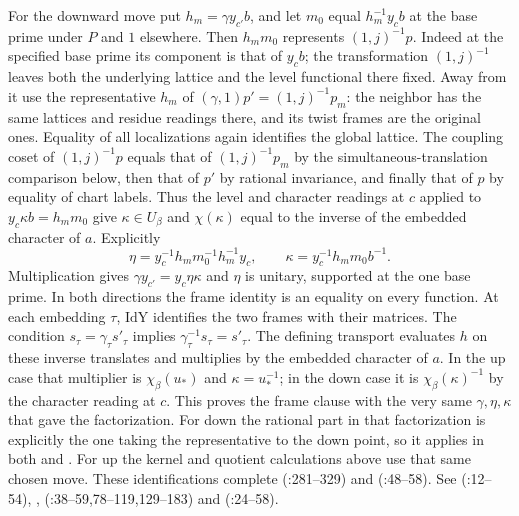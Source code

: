 For the downward move put $h_m=\gamma y_{c'}b$, and let $m_0$ equal
$h_m^{-1}y_c b$ at the base prime under $P$ and $1$ elsewhere.
Then $h_m m_0$ represents $(1,j)^{-1}p$. Indeed at the specified
base prime its component is that of $y_c b$; the transformation
$(1,j)^{-1}$ leaves both the underlying lattice and the level functional
there fixed. Away from it use the representative $h_m$ of
$(\gamma,1)p'=(1,j)^{-1}p_m$: the neighbor has the same lattices and
residue readings there, and its twist frames are the original ones.
Equality of all localizations again identifies the global lattice.
The coupling coset of $(1,j)^{-1}p$ equals that of $(1,j)^{-1}p_m$
by the simultaneous-translation comparison below, then that of $p'$
by rational invariance, and finally that of $p$ by equality of chart
labels. Thus the level and character readings at $c$ applied to
$y_c\kappa b=h_m m_0$ give $\kappa\in U_\beta$ and
$\chi(\kappa)$ equal to the inverse of the embedded character of $a$.
Explicitly
\[
 \eta=y_c^{-1}h_m m_0^{-1}h_m^{-1}y_c,\qquad
 \kappa=y_c^{-1}h_m m_0 b^{-1}.
\]
Multiplication gives $\gamma y_{c'}=y_c\eta\kappa$ and $\eta$ is
unitary, supported at the one base prime. In both directions the frame
identity is an equality on every function. At each embedding $\tau$,
$\mathrm{IdY}$ identifies the two frames with their matrices. The
condition $s_\tau=\gamma_\tau s'_\tau$ implies
$\gamma_\tau^{-1}s_\tau=s'_\tau$. The defining transport evaluates
$h$ on these inverse translates and multiplies by the embedded
character of $a$. In the up case that multiplier is $\chi_\beta(u_*)$
and $\kappa=u_*^{-1}$; in the down case it is $\chi_\beta(\kappa)^{-1}$
by the character reading at $c$. This proves the frame clause with
the very same $\gamma,\eta,\kappa$ that gave the factorization.
For down the rational part in that factorization is explicitly the
one taking the representative to the down point, so it applies in
both  and . For up the
kernel and quotient calculations above use that same chosen move.
These identifications complete 
(:281--329) and 
(:48--58).
See 
(:12--54),
, 
(:38--59,78--119,129--183)
and  (:24--58).

